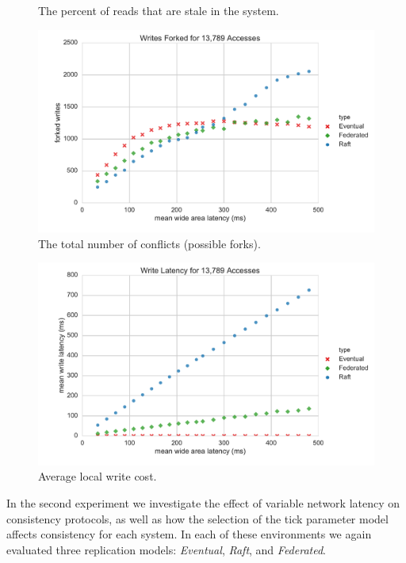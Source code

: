 \documentclass[10pt,conference,letterpaper]{IEEEtran}
\begin{document}
\begin{figure}[t]
      \caption{The percent of reads that are stale in the system.}\label{fig:latency_stale_reads}
    \endminipage
      \includegraphics[width=\linewidth]{figures/latency/forked_writes}
      \caption{The total number of conflicts (possible forks).}\label{fig:latency_forked_writes}
    \endminipage\hfill
\end{figure}

\begin{figure}[t]
    \centering
      \includegraphics[width=\linewidth]{figures/latency/write_latency}
      \caption{Average local write cost.}\label{fig:write_latency}
    \endminipage\hfill
\end{figure}

In the second experiment we investigate the effect of variable network
latency on consistency protocols, as well as how the selection of the tick parameter
model affects consistency for each system.
In each of these environments we again evaluated three replication models:
\textit{Eventual}, \textit{Raft}, and \textit{Federated}.
\end{document}
